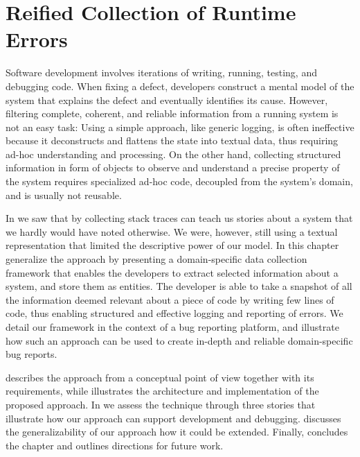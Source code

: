 

\chapter{Reified Collection of Runtime Errors}\label{ch:reified}


Software development involves iterations of writing, running, testing, and debugging code.
When fixing a defect, developers construct a mental model of the system that explains the defect and eventually identifies its cause.
However, filtering complete, coherent, and reliable information from a running system is not an easy task: Using a simple approach, like generic logging, is often ineffective because it deconstructs and flattens the state into textual data, thus requiring ad-hoc understanding and processing.
On the other hand, collecting structured information in form of objects to observe and understand a precise property of the system requires specialized ad-hoc code, decoupled from the system's domain, and is usually not reusable.

In  we saw that by collecting stack traces can teach us stories about a system that we hardly would have noted otherwise.
We were, however, still using a textual representation that limited the descriptive power of our model.
In this chapter generalize the approach by presenting a domain-specific data collection framework that enables the developers to extract selected information about a system, and store them as entities.
The developer is able to take a snapshot of all the information deemed relevant about a piece of code by writing few lines of code, thus enabling structured and effective logging and reporting of errors.
We detail our framework in the context of a bug reporting platform, and illustrate how such an approach can be used to create in-depth and reliable domain-specific bug reports.

\structure

 describes the approach from a conceptual point of view together with its requirements, while  illustrates the architecture and implementation of the proposed approach.
In  we assess the technique through three stories that illustrate how our approach can support development and debugging.
 discusses the generalizability of our approach how it could be extended.
Finally,  concludes the chapter and outlines directions for future work.


